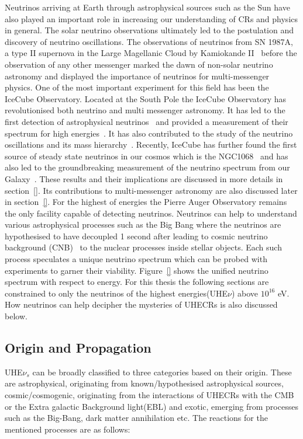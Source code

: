 Neutrinos arriving at Earth through astrophysical sources such as the Sun have also played an important role in increasing our understanding of CRs and physics in general. The solar neutrino observations ultimately led to the postulation and discovery of neutrino oscillations. The observations of neutrinos from SN 1987A, a type II supernova in the Large Magellanic Cloud by Kamiokande II~\cite{} before the observation of any other messenger marked the dawn of non-solar neutrino astronomy and displayed the importance of neutrinos for multi-messenger physics. One of the most important experiment for this field has been the IceCube Observatory. Located at the South Pole the IceCube Observatory has revolutionised both neutrino and multi messenger astronomy. It has led to the first detection of astrophysical neutrinos~\cite{} and provided a measurement of their spectrum for high energies~\cite{}. It has also contributed to the study of the neutrino oscillations\cite{} and its mass hierarchy~\cite{}. Recently, IceCube has further found the first source of steady state neutrinos in our cosmos which is the NGC1068~\cite{} and has also led to the groundbreaking measurement of the  neutrino spectrum from our Galaxy~\cite{}. These results and their implications are discussed in more details in section~\ref{}. Its contributions to multi-messenger astronomy are also discussed later in section~\ref{}. For the highest of energies the Pierre Auger Observatory remains the only facility capable of detecting neutrinos. 
Neutrinos can help to understand various astrophysical processes such as the Big Bang where the neutrinos are hypothesised to have decoupled 1 second after leading to cosmic neutrino background (CNB)~\cite{} to the nuclear processes inside stellar objects. Each such process speculates a unique neutrino spectrum which can be probed with experiments to garner their viability. Figure~\ref{} shows the unified neutrino spectrum with respect to energy. For this thesis the following sections are constrained to only the neutrinos of the highest energies(UHE$\nu$) above $10^16$ eV. How neutrinos can help decipher the mysteries of UHECRs is also discussed below.


\subsection{Origin and Propagation}
\label{subsec:nuorig}
UHE$\nu_s$ can be broadly classified to three categories based on their origin. These are astrophysical, originating from known/hypothesised astrophysical sources, cosmic/cosmogenic, originating from the interactions of UHECRs with the CMB or the Extra galactic Background light(EBL) and exotic, emerging from processes such as the Big-Bang, dark matter annihilation etc. The reactions for the mentioned processes are as follows:



